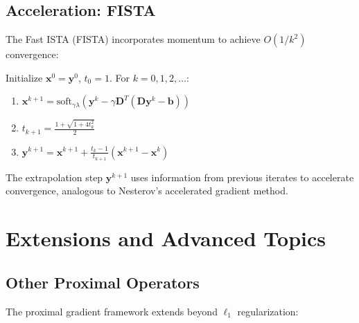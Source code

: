 \documentclass[12pt]{article}
\renewcommand{\vec}[1]{\mathbf{#1}}
\theoremstyle{definition}
\begin{document}
\subsection{Acceleration: FISTA}

The Fast ISTA (FISTA) incorporates momentum to achieve $O(1/k^2)$ convergence:

\begin{algorithm}
    Initialize $\vec{x}^0 = \vec{y}^0$, $t_0 = 1$. For $k = 0, 1, 2, \ldots$:
    \begin{enumerate}
        \item $\vec{x}^{k+1} = \text{soft}_{\gamma\lambda}(\vec{y}^k - \gamma \vec{D}^T(\vec{D}\vec{y}^k - \vec{b}))$
        \item $t_{k+1} = \frac{1 + \sqrt{1 + 4t_k^2}}{2}$
        \item $\vec{y}^{k+1} = \vec{x}^{k+1} + \frac{t_k - 1}{t_{k+1}}(\vec{x}^{k+1} - \vec{x}^k)$
    \end{enumerate}
\end{algorithm}

The extrapolation step $\vec{y}^{k+1}$ uses information from previous iterates to accelerate convergence, analogous to Nesterov's accelerated gradient method.

\newpage
\section{Extensions and Advanced Topics}

\subsection{Other Proximal Operators}

The proximal gradient framework extends beyond $\ell_1$ regularization:
\end{document}
